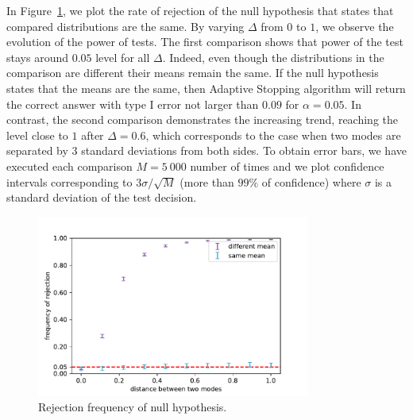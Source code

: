 \documentclass{article}
\theoremstyle{plain}
\theoremstyle{remark}
\newcommand{\1}{\mathbbm{1}}
\numberwithin{equation}{section}
\begin{document}
 In Figure~\ref{fig.exp1-2}, we plot the rate of rejection of the null hypothesis that states that compared distributions are the same. By varying $\Delta$ from $0$ to $1$, we observe the evolution of the power of tests. The first comparison shows that power of the test stays around $0.05$ level for all $\Delta$. Indeed, even though the distributions in the comparison are different their means remain the same. If the null hypothesis states that the means are the same, then Adaptive Stopping algorithm will return the correct answer with type I error not larger than $0.09$ for $\alpha=0.05$. 
 In contrast, the second comparison demonstrates the increasing trend, reaching the level close to $1$ after $\Delta = 0.6$, which corresponds to the case when two modes are separated by $3$ standard deviations from both sides.
 To obtain error bars, we have executed each comparison $M=5\ 000$ number of times and we plot confidence intervals corresponding to $3 \sigma / \sqrt{M}$ (more than $99\%$ of confidence) where $\sigma$ is a standard deviation of the test decision.


 \begin{figure}[h]
  \begin{center}
    \includegraphics[width=0.8\textwidth]{fig/gaussianVSmg_exp1-2.pdf}
    \caption{Rejection frequency of null hypothesis.}
    \label{fig.exp1-2}
  \end{center}
\end{figure}
\end{document}
